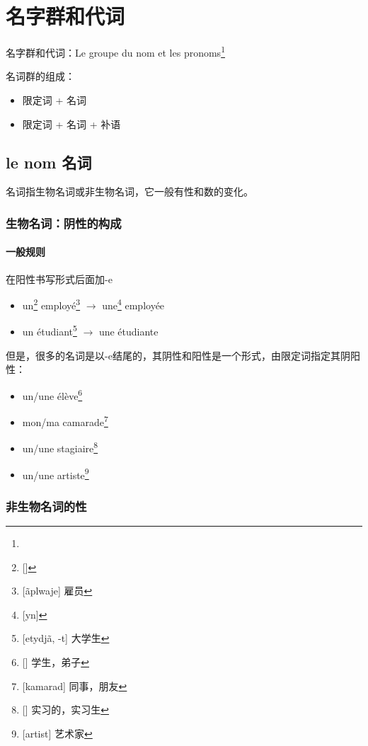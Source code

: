 
\chapter{名字群和代词}
名字群和代词：Le groupe du nom et les pronoms\footnote{}

名词群的组成：
\begin{itemize}
\item 限定词 + 名词
\item 限定词 + 名词 + 补语
\end{itemize}


\section{le nom 名词}
名词指生物名词或非生物名词，它一般有性和数的变化。


\subsection{生物名词：阴性的构成}

\subsubsection{一般规则}

在阳性书写形式后面加-e
\begin{itemize}
\item un\footnote{[\textipa{\~\oe}]} employé\footnote{[\~aplwaje] 雇员} $\rightarrow$ une\footnote{[yn]} employée
\item un étudiant\footnote{[etydj\~a, -t] 大学生} $\rightarrow$ une étudiante
\end{itemize}

但是，很多的名词是以-e结尾的，其阴性和阳性是一个形式，由限定词指定其阴阳性：
\begin{itemize}
\item un/une élève\footnote{[] 学生，弟子}
\item mon/ma camarade\footnote{[kamarad] 同事，朋友}
\item un/une stagiaire\footnote{[] 实习的，实习生}
\item un/une artiste\footnote{[artist] 艺术家}
\end{itemize}

\subsection{非生物名词的性}

